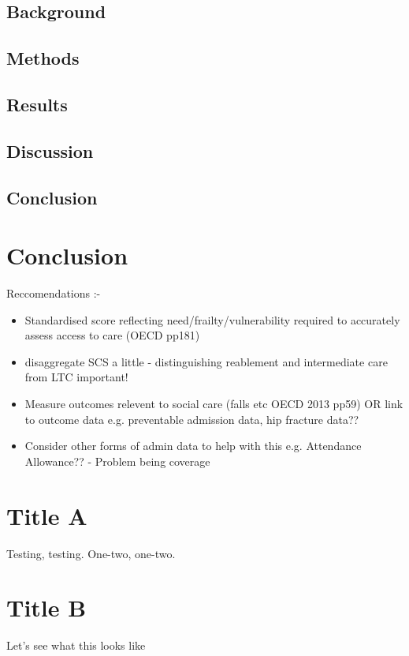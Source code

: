 \documentclass[12pt,]{report}
\begin{document}
\section{Background}\label{sec:sc-outcomes-background}

\section{Methods}\label{sec:sc-outcomes-methods}

\section{Results}\label{sec:sc-outcomes-results}

\section{Discussion}\label{sec:sc-outcomes-discussion}

\section{Conclusion}\label{sec:sc-outcomes-conclusion}

\FloatBarrier
\newpage
{}

\chapter{Conclusion}\label{ch:conclusion}

Reccomendations :-

\begin{itemize}
\item Standardised score reflecting need/frailty/vulnerability required to accurately assess access to care (OECD pp181)
\item disaggregate SCS a little - distinguishing reablement and intermediate care from LTC important!
\item Measure outcomes relevent to social care (falls etc OECD 2013 pp59) OR link to outcome data e.g. preventable admission data, hip fracture data??
\item Consider other forms of admin data to help with this e.g. Attendance Allowance?? - Problem being coverage
\end{itemize}

\FloatBarrier
\newpage
{}

\appendix
\chapter{Title A}

Testing, testing. One-two, one-two.

\chapter{Title B}

Let's see what this looks like

\FloatBarrier
\clearpage



\end{document}
